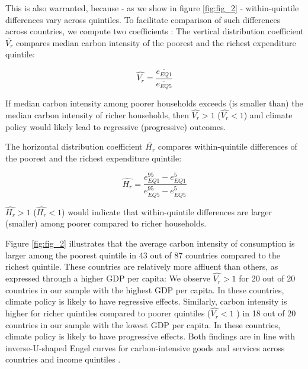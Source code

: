 \documentclass[12pt, a4paper]{article}
\begin{document}
This is also warranted, because - as we show in figure \ref{fig:fig_2} - within-quintile differences vary across quintiles. To facilitate comparison of such differences across countries, we compute two coefficients \autocite{Missbach.2024}: The vertical distribution coefficient $\overline{V_{r}}$ compares median carbon intensity of the poorest and the richest expenditure quintile:

\begin{equation}
    \widehat{V_{r}} = \frac{\overline{e_{EQ1}}}{\overline{e_{EQ5}}}
\end{equation}

If median carbon intensity among poorer households exceeds (is smaller than) the median carbon intensity of richer households, then $\widehat{V_{r}}>1$ ($\widehat{V_{r}}<1$) and climate policy would likely lead to regressive (progressive) outcomes.

The horizontal distribution coefficient $\overline{H_{r}}$ compares within-quintile differences of the poorest and the richest expenditure quintile:

\begin{equation}
    \widehat{H_{r}} = \frac{e_{EQ1}^{95} - e_{EQ1}^{5}}{e_{EQ5}^{95} - e_{EQ5}^{5}}
\end{equation}

$\widehat{H_{r}}>1$ ($\widehat{H_{r}}<1$) would indicate that within-quintile differences are larger (smaller) among poorer compared to richer households.

Figure \ref{fig:fig_2} illustrates that the average carbon intensity of consumption is larger among the poorest quintile in 43 out of 87 countries compared to the richest quintile. These countries are relatively more affluent than others, as expressed through a higher GDP per capita: We observe $\widehat{V_{r}}>1$ for 20 out of 20 countries in our sample with the highest GDP per capita. In these countries, climate policy is likely to have regressive effects. Similarly, carbon intensity is higher for richer quintiles compared to poorer quintiles ($\widehat{V_{r}}<1$ ) in 18 out of 20 countries in our sample with the lowest GDP per capita. In these countries, climate policy is likely to have progressive effects. Both findings are in line with inverse-U-shaped Engel curves for carbon-intensive goods and services across countries and income quintiles \autocite{Dorband.2019}. 

\end{document}
